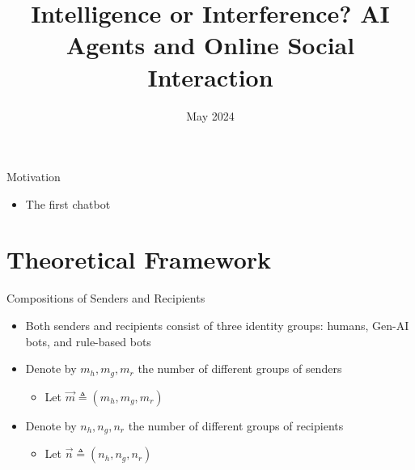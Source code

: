 \documentclass[9pt,aspectratio=1610]{beamer}
\author[Ash, Lou, Song]{%
    \texorpdfstring{%
    \begin{columns}
        \column{.3333\linewidth}
        \centering
        Elliot Ash \\\vspace{.5em} \small ETH Zurich
        \column{.3333\linewidth}
        \centering
        Yichuan Lou \\\vspace{.5em} \small UTokyo
        \column{.3333\linewidth}
        \centering
        Lena Song \\\vspace{.5em} \small UIUC
    \end{columns}}{Elliot Ash, Yichuan Lou, Lena Song}
}
\title[Intelligence or Interference?]{Intelligence or Interference? AI Agents and Online Social Interaction}
\date[Conference Name]{May 2024}
\begin{document}
\begin{frame}[plain]
    \titlepage
\end{frame}

\begin{frame}{Motivation}
\begin{itemize}
\item The first chatbot
\end{itemize}


\end{frame}

\section{Theoretical Framework}

\begin{frame}{Compositions of Senders and Recipients}

\begin{itemize}\setlength{\itemsep}{1em}
    \item Both senders and recipients consist of three \textcolor{orange0}{identity} groups: humans, Gen-AI bots, and rule-based bots
    \item Denote by $m_h,m_g,m_r$ the number of different groups of senders 
    \begin{itemize}
        \item Let $\vec{m} \triangleq (m_h,m_g,m_r)$
    \end{itemize}
    \item Denote by $n_h,n_g,n_r$ the number of different groups of recipients
    \begin{itemize}
        \item Let $\vec{n} \triangleq (n_h,n_g,n_r)$
    \end{itemize}
\end{itemize}
\end{frame}

    
\end{document}
